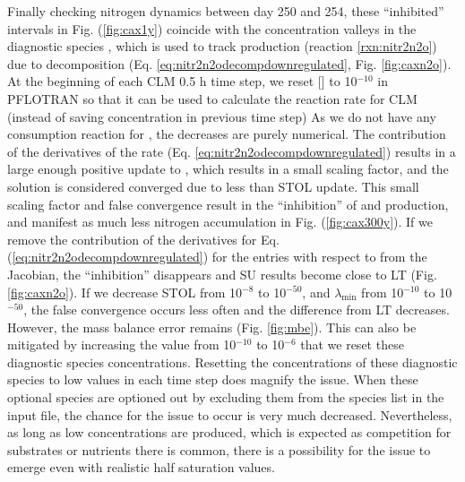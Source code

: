\documentclass[gmd, manuscript]{copernicus}
\begin{document}
Finally checking nitrogen dynamics between day 250 and 254, these ``inhibited''
intervals in Fig. (\ref{fig:cax1y}) coincide with the concentration valleys
in the diagnostic species , which is used to track 
production (reaction \ref{rxn:nitr2n2o}) due to decomposition (Eq.
\ref{eq:nitr2n2odecompdownregulated}, Fig. \ref{fig:caxn2o}). At the
beginning of each CLM 0.5 h time step, we reset [] to
10$^{-10}$ in PFLOTRAN so that it can be used to calculate the reaction rate
for CLM (instead of saving concentration in previous time step)
As we do not have any
consumption reaction for , the decreases are purely numerical. The
contribution of the derivatives of the rate (Eq.
\ref{eq:nitr2n2odecompdownregulated}) results in a large enough positive update
to , which results in a small scaling factor, and the solution is
considered converged due to less than STOL update. This small scaling factor
and false convergence result in the ``inhibition'' of  and
 production, and manifest as much less nitrogen accumulation in
Fig. (\ref{fig:cax300y}). If we remove the contribution of the derivatives
for Eq. (\ref{eq:nitr2n2odecompdownregulated}) for the entries with respect to
 from the Jacobian,  the ``inhibition'' disappears and SU results
become close to LT (Fig. \ref{fig:caxn2o}). If we decrease STOL from
10$^{-8}$ to 10$^{-50}$, and $\lambda_\text{min}$ from 10$^{-10}$ to
10$^{-50}$, the false convergence occurs less often and the difference from LT
decreases. However, the mass balance error remains (Fig. \ref{fig:mbe}). This
can also be mitigated by increasing the value from 10$^{-10}$
to 10$^{-6}$ that we reset these diagnostic species concentrations.
Resetting the concentrations of these diagnostic species to low values in each
time step does magnify the issue. When these optional species are optioned out
by excluding them from the species list in the input file, the chance for the
issue to occur is very much decreased. Nevertheless, as long as low concentrations
are produced, which is expected as competition for substrates or nutrients there
is common, there is a possibility for the issue to emerge even with
realistic half saturation values.  
\end{document}
